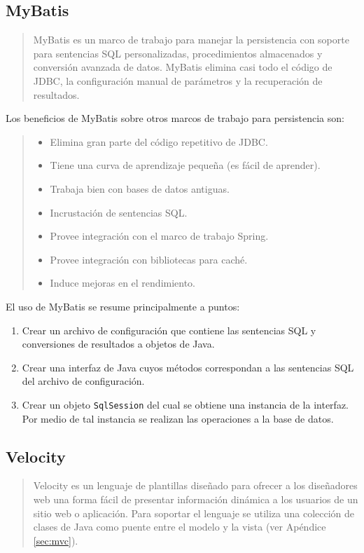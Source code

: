 \subsection{MyBatis}\label{sec:mybatis}
\begin{quote}
MyBatis es un marco de trabajo para manejar la persistencia con soporte para sentencias SQL personalizadas, procedimientos almacenados y conversión avanzada de datos. MyBatis elimina casi todo el código de JDBC, la configuración manual de parámetros y la recuperación de resultados\cite{MyBatis}.
\end{quote}

Los beneficios de MyBatis sobre otros marcos de trabajo para persistencia son\cite{PersistenceWithMyBatis}:
\begin{quote}
	\begin{itemize}
		\item Elimina gran parte del código repetitivo de JDBC.
		\item Tiene una curva de aprendizaje pequeña (es fácil de aprender).
		\item Trabaja bien con bases de datos antiguas.
		\item Incrustación de sentencias SQL.
		\item Provee integración con el marco de trabajo Spring.
		\item Provee integración con bibliotecas para caché.
		\item Induce mejoras en el rendimiento.
	\end{itemize}
\end{quote}

El uso de MyBatis se resume principalmente a puntos\cite{PersistenceWithMyBatis}:
\begin{enumerate}
	\item Crear un archivo de configuración que contiene las sentencias SQL y conversiones de resultados a objetos de Java.
	\item Crear una interfaz de Java cuyos métodos correspondan a las sentencias SQL del archivo de configuración.
	\item Crear un objeto \texttt{SqlSession} del cual se obtiene una instancia de la interfaz. Por medio de tal instancia se realizan las operaciones a la base de datos.
\end{enumerate}

\subsection{Velocity}\label{sec:velocity}
\begin{quote}
	Velocity es un lenguaje de plantillas diseñado para ofrecer a los diseñadores web una forma fácil de presentar información dinámica a los usuarios de un sitio web o aplicación. Para soportar el lenguaje se utiliza una colección de clases de Java como puente entre el modelo y la vista\cite{MasteringApacheVelocity} (ver Apéndice \ref{sec:mvc}).
\end{quote}

